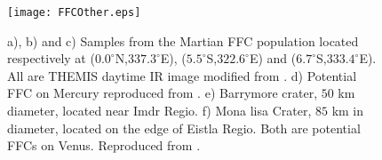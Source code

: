 \begin{figure}[htpb]
  \begin{center}
    \graphicspath{ {/Users/thorey/Documents/These/Manuscript/Figure/Chapter7/} }
    \texttt{[image: FFCOther.eps]}
    \caption{a),  b) and  c) Samples  from the  Martian FFC  population
      located  respectively  at ($0.0^{\circ}$N,$337.3  ^{\circ}  $E),
      ($5.5^{\circ}$S,$322.6         ^{\circ}          $E)         and
      ($6.7^{\circ}$S,$333.4^{\circ}$E).   All are  THEMIS daytime  IR
      image  modified from  \citet{Sato:2010ex}. d)  Potential FFC  on
      Mercury  reproduced  from \citet{Schultz:1977ec}.  e)  Barrymore
      crater, $50$ km diameter, located  near Imdr Regio. f) Mona lisa
      Crater,  $85$ km  in diameter,  located  on the  edge of  Eistla
      Regio.   Both  are potential  FFCs  on  Venus.  Reproduced  from
      \citet{Wichman:1995ju}.}
    \label{C7-FFCOther}
  \end{center}
\end{figure}

